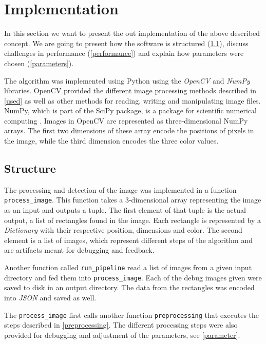 \section{Implementation}

In this section we want to present the out implementation of the above described
concept. We are going to present how the software is structured (\ref{structure}),
discuss challenges in performance (\ref{performance}) and explain how parameters
were chosen (\ref{parameters}).

The algorithm was implemented using Python using the \textit{OpenCV} and
\textit{NumPy} libraries. OpenCV provided the different image processing methods
described in \ref{used} as well as other methods for reading, writing
and manipulating image files. NumPy, which is part of the SciPy package, is a
package for scientific numerical computing \cite{scipy}. Images in OpenCV are
represented as three-dimensional NumPy arrays. The first two dimensions of these
array encode the positions of pixels in the image, while the third dimension
encodes the three color values.

\subsection{Structure} \label{structure}

The processing and detection of the image was implemented in a function
\texttt{process\_image}. This function takes a 3-dimensional array representing
the image as an input and outputs a tuple. The first element of that tuple is
the actual output, a list of rectangles found in the image. Each rectangle is
represented by a \textit{Dictionary} with their respective position, dimensions
and color. The second element is a list of images, which represent different steps
of the algorithm and are artifacts meant for debugging and feedback.

Another function called \texttt{run\_pipeline} read a list of images from a
given input directory and fed them into \texttt{process\_image}. Each of the
debug images given were saved to disk in an output directory. The data from the
rectangles was encoded into \textit{JSON} and saved as well.

The \texttt{process\_image} first calls another function \texttt{preprocessing}
that executes the steps described in \ref{preprocessing}. The different
processing steps were also provided for debugging and adjustment of the
parameters, see \ref{parameter}.

